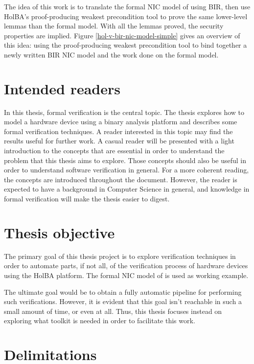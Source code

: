 \documentclass{kththesis}
\begin{document}
The idea of this work is to translate the formal \gls{NIC} model of \cite{haglund_formal_2016} using \gls{BIR}, then use HolBA's proof-producing weakest precondition tool to prove the same lower-level lemmas than the formal model. With all the lemmas proved, the security properties are implied. Figure \ref{hol-v-bir-nic-model-simple} gives an overview of this idea: using the proof-producing weakest precondition tool to bind together a newly written BIR NIC model and the work done on the formal model.

\section{Intended readers}

In this thesis, formal verification is the central topic. The thesis explores how to model a hardware device using a binary analysis platform and describes some formal verification techniques. A reader interested in this topic may find the results useful for further work. A casual reader will be presented with a light introduction to the concepts that are essential in order to understand the problem that this thesis aims to explore. Those concepts should also be useful in order to understand software verification in general. For a more coherent reading, the concepts are introduced throughout the document. However, the reader is expected to have a background in Computer Science in general, and knowledge in formal verification will make the thesis easier to digest.

\section{Thesis objective}

The primary goal of this thesis project is to explore verification techniques in order to automate parts, if not all, of the verification process of hardware devices using the HolBA platform. The formal \gls{NIC} model of \cite{haglund_formal_2016} is used as working example.

The ultimate goal would be to obtain a fully automatic pipeline for performing such verifications. However, it is evident that this goal isn't reachable in such a small amount of time, or even at all. Thus, this thesis focuses instead on exploring what toolkit is needed in order to facilitate this work.

\section{Delimitations}
\end{document}
